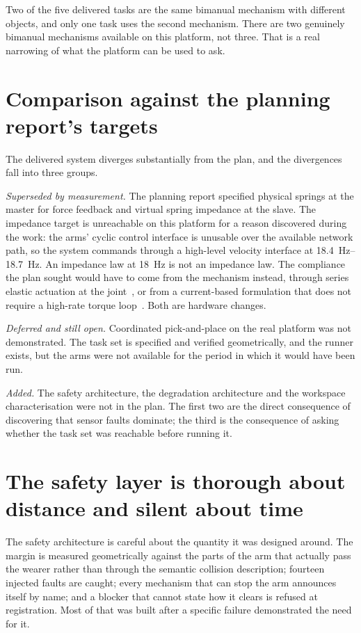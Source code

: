 Two of the five delivered tasks are the same bimanual mechanism with different
objects, and only one task uses the second mechanism. There are two genuinely
bimanual mechanisms available on this platform, not three. That is a real
narrowing of what the platform can be used to ask.

\section{Comparison against the planning report's targets}

The delivered system diverges substantially from the plan, and the divergences
fall into three groups.

\emph{Superseded by measurement.} The planning report specified physical
springs at the master for force feedback and virtual spring impedance at the
slave. The impedance target is unreachable on this platform for a reason
discovered during the work: the arms' cyclic control interface is unusable
over the available network path, so the system commands through a high-level
velocity interface at \SIrange{18.4}{18.7}{\hertz}. An impedance law at
\SI{18}{\hertz} is not an impedance law. The compliance the plan sought would
have to come from the mechanism instead, through series elastic actuation at
the joint~\cite{toubar2022sea,lee2019sea}, or from a current-based
formulation that does not require a high-rate torque
loop~\cite{dewolde2024impedance}. Both are hardware changes.

\emph{Deferred and still open.} Coordinated pick-and-place on the real
platform was not demonstrated. The task set is specified and verified
geometrically, and the runner exists, but the arms were not available for the
period in which it would have been run.

\emph{Added.} The safety architecture, the degradation architecture and the
workspace characterisation were not in the plan. The first two are the direct
consequence of discovering that sensor faults dominate; the third is the
consequence of asking whether the task set was reachable before running it.

\section{The safety layer is thorough about distance and silent about time}

The safety architecture is careful about the quantity it was designed around.
The margin is measured geometrically against the parts of the arm that
actually pass the wearer rather than through the semantic collision
description; fourteen injected faults are caught; every mechanism that can
stop the arm announces itself by name; and a blocker that cannot state how it
clears is refused at registration. Most of that was built after a specific
failure demonstrated the need for it.

